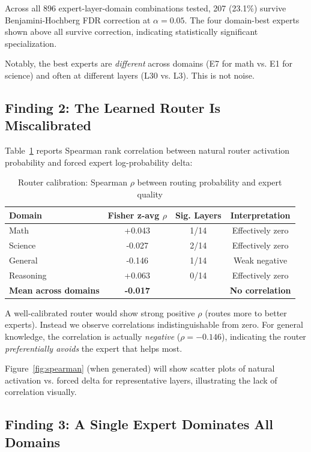 \documentclass[11pt,a4paper]{article}
\begin{document}
Across all 896 expert-layer-domain combinations tested, 207 (23.1\%) survive Benjamini-Hochberg FDR correction at $\alpha = 0.05$. The four domain-best experts shown above all survive correction, indicating statistically significant specialization.

Notably, the best experts are \textit{different} across domains (E7 for math vs. E1 for science) and often at different layers (L30 vs. L3). This is not noise.

\subsection{Finding 2: The Learned Router Is Miscalibrated}

Table~\ref{tab:spearman} reports Spearman rank correlation between natural router activation probability and forced expert log-probability delta:

\begin{table}[h]
\centering
\caption{Router calibration: Spearman $\rho$ between routing probability and expert quality}
\label{tab:spearman}
\begin{tabular}{lccc}
\toprule
\textbf{Domain} & \textbf{Fisher z-avg $\rho$} & \textbf{Sig. Layers} & \textbf{Interpretation} \\
\midrule
Math & +0.043 & 1/14 & Effectively zero \\
Science & -0.027 & 2/14 & Effectively zero \\
General & -0.146 & 1/14 & Weak negative \\
Reasoning & +0.063 & 0/14 & Effectively zero \\
\midrule
\textbf{Mean across domains} & \textbf{-0.017} & & \textbf{No correlation} \\
\bottomrule
\end{tabular}
\end{table}

A well-calibrated router would show strong positive $\rho$ (routes more to better experts). Instead we observe correlations indistinguishable from zero. For general knowledge, the correlation is actually \textit{negative} ($\rho = -0.146$), indicating the router \textit{preferentially avoids} the expert that helps most.

Figure~\ref{fig:spearman} (when generated) will show scatter plots of natural activation vs. forced delta for representative layers, illustrating the lack of correlation visually.

\subsection{Finding 3: A Single Expert Dominates All Domains}
\end{document}
